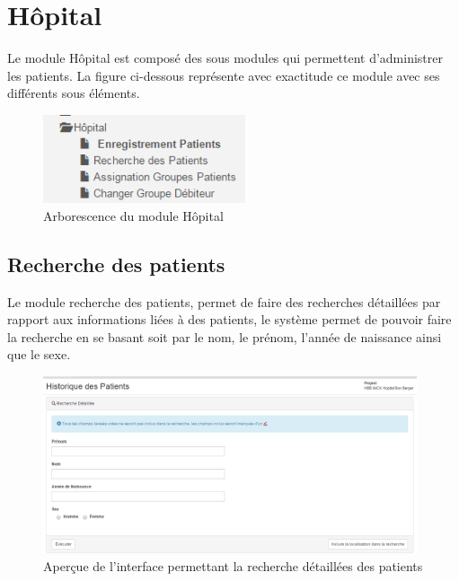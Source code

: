 \documentclass[12pt,a4paper]{report}
\begin{document}
\newpage
\chapter{Hôpital}        

Le module Hôpital est composé des sous modules qui permettent d'administrer les patients. La figure ci-dessous représente avec exactitude ce module avec ses différents sous éléments.

\begin{figure}[h]
\begin{center}
\includegraphics[width=6cm]{pic/HopitalArbo.png}
\end{center}
\caption{Arborescence du module Hôpital}
\label{Arborescence du module Hôpital}
\end{figure}


\newpage
\section{Recherche des patients}
Le module recherche des patients, permet de faire des recherches détaillées par rapport aux informations liées à des patients, le système permet de pouvoir faire la recherche en se basant soit par le nom, le prénom, l'année de naissance ainsi que le sexe.

\begin{figure}[h]
\begin{center}
\includegraphics[width=11cm]{pic/recherchePatient.png}
\end{center}
\caption{Aperçue de l'interface permettant la recherche détaillées des patients}
\label{Aperçue de l'interface permettant la recherche détaillées des patients}
\end{figure}  
\end{document}
